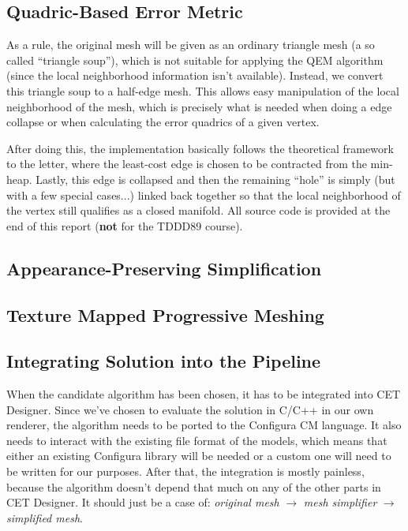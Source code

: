 \subsection{Quadric-Based Error Metric} \label{sec:quadric-based_error_metric2}

As a rule, the original mesh will be given as an ordinary triangle mesh (a so called ``triangle soup''), which is not suitable for applying the QEM algorithm (since the local neighborhood information isn't available). Instead, we convert this triangle soup to a half-edge mesh. This allows easy manipulation of the local neighborhood of the mesh, which is precisely what is needed when doing a edge collapse or when calculating the error quadrics of a given vertex.

After doing this, the implementation basically follows the theoretical framework to the letter, where the least-cost edge is chosen to be contracted from the min-heap. Lastly, this edge is collapsed and then the remaining ``hole'' is simply (but with a few special cases...) linked back together so that the local neighborhood of the vertex still qualifies as a closed manifold. All source code is provided at the end of this report (\textbf{not} for the TDDD89 course).

\subsection{Appearance-Preserving Simplification} \label{sec:appearance-preserving_simplification2}

\subsection{Texture Mapped Progressive Meshing} \label{sec:texture_mapped_progressive_meshing2}

\subsection{Integrating Solution into the Pipeline} \label{sec:integrating_solution_into_the_pipeline}

When the candidate algorithm has been chosen, it has to be integrated into CET Designer. Since we've chosen to evaluate the solution in C/C++ in our own renderer, the algorithm needs to be ported to the Configura CM language. It also needs to interact with the existing file format of the models, which means that either an existing Configura library will be needed or a custom one will need to be written for our purposes. After that, the integration is mostly painless, because the algorithm doesn't depend that much on any of the other parts in CET Designer. It should just be a case of: \emph{original mesh} $\rightarrow$ \emph{mesh simplifier} $\rightarrow$ \emph{simplified mesh}.

